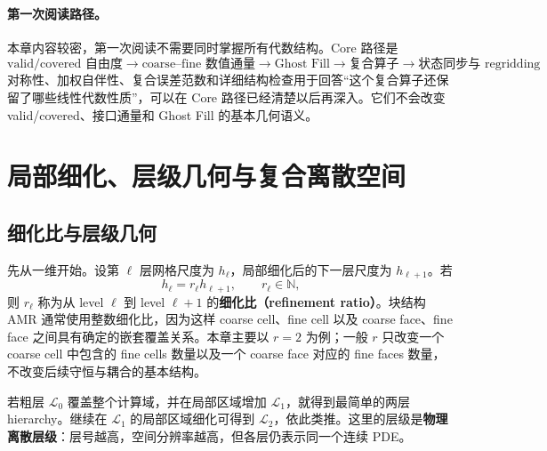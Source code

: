 \paragraph{第一次阅读路径。}
本章内容较密，第一次阅读不需要同时掌握所有代数结构。Core 路径是
\begin{equation}
\boxed{
\text{valid/covered 自由度}
\rightarrow
\text{coarse--fine 数值通量}
\rightarrow
\text{Ghost Fill}
\rightarrow
\text{复合算子}
\rightarrow
\text{状态同步与 regridding}
}
\label{eq:amr-first-pass-path}
\end{equation}
对称性、加权自伴性、复合误差范数和详细结构检查用于回答“这个复合算子还保留了哪些线性代数性质”，可以在 Core 路径已经清楚以后再深入。它们不会改变 valid/covered、接口通量和 Ghost Fill 的基本几何语义。

\section{局部细化、层级几何与复合离散空间}
\label{sec:amr-hierarchy-space}

\subsection{细化比与层级几何}

先从一维开始。设第 $\ell$ 层网格尺度为 $h_\ell$，局部细化后的下一层尺度为 $h_{\ell+1}$。若
\begin{equation}
 h_\ell=r_\ell h_{\ell+1},
 \qquad r_\ell\in\mathbb N,
\label{eq:amr-refinement-ratio}
\end{equation}
则 $r_\ell$ 称为从 level $\ell$ 到 level $\ell+1$ 的\textbf{细化比（refinement ratio）}。块结构 AMR 通常使用整数细化比，因为这样 coarse cell、fine cell 以及 coarse face、fine face 之间具有确定的嵌套覆盖关系。本章主要以 $r=2$ 为例；一般 $r$ 只改变一个 coarse cell 中包含的 fine cells 数量以及一个 coarse face 对应的 fine faces 数量，不改变后续守恒与耦合的基本结构。

若粗层 $\mathcal L_0$ 覆盖整个计算域，并在局部区域增加 $\mathcal L_1$，就得到最简单的两层 hierarchy。继续在 $\mathcal L_1$ 的局部区域细化可得到 $\mathcal L_2$，依此类推。这里的层级是\textbf{物理离散层级}：层号越高，空间分辨率越高，但各层仍表示同一个连续 PDE。


